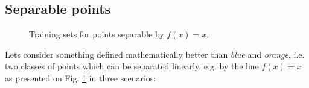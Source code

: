 \subsection{Separable points}
\label{sec: knnSep}

\begin{figure}
\hfill
{}
\hfill
{}
\hfill
\centering{}
\hfill
\caption{Training sets for points separable by $f(x) = x$.}
\label{fig: knnSepTrainSet}
\end{figure}

Lets consider something defined mathematically better than {\it blue} and {\it orange}, i.e. two classes of points which can be separated linearly, e.g. by the line $f(x) = x$ as presented on Fig. \ref{fig: knnSepTrainSet} in three scenarios:

